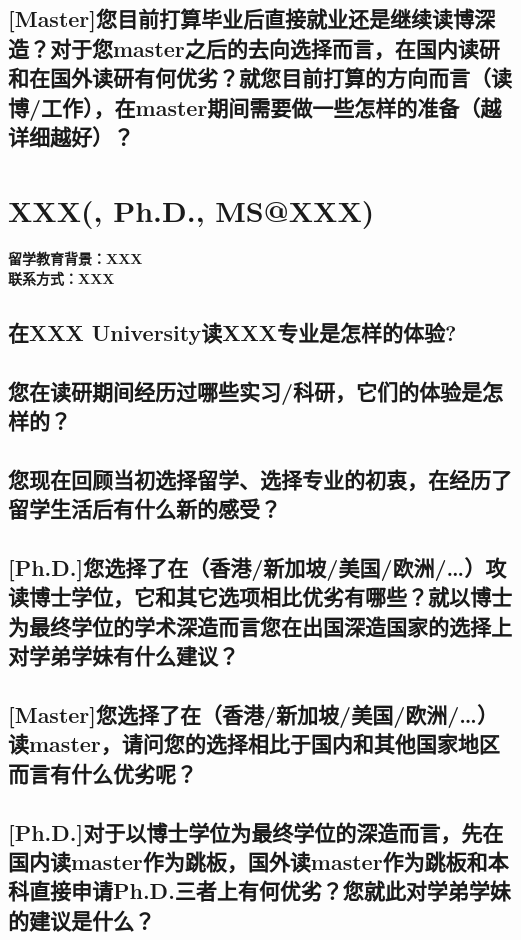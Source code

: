 \documentclass[a4paper,UTF8]{book}
\begin{document}
\subsection*{[Master]您目前打算毕业后直接就业还是继续读博深造？对于您master之后的去向选择而言，在国内读研和在国外读研有何优劣？就您目前打算的方向而言（读博/工作），在master期间需要做一些怎样的准备（越详细越好）？}

\newpage
\section{XXX(, Ph.D., MS@XXX)}
\paragraph{留学教育背景：XXX\\联系方式：XXX}

\subsection*{在XXX University读XXX专业是怎样的体验?}

\subsection*{您在读研期间经历过哪些实习/科研，它们的体验是怎样的？}

\subsection*{您现在回顾当初选择留学、选择专业的初衷，在经历了留学生活后有什么新的感受？}

\subsection*{[Ph.D.]您选择了在（香港/新加坡/美国/欧洲/…）攻读博士学位，它和其它选项相比优劣有哪些？就以博士为最终学位的学术深造而言您在出国深造国家的选择上对学弟学妹有什么建议？}

\subsection*{[Master]您选择了在（香港/新加坡/美国/欧洲/…）读master，请问您的选择相比于国内和其他国家地区而言有什么优劣呢？}

\subsection*{[Ph.D.]对于以博士学位为最终学位的深造而言，先在国内读master作为跳板，国外读master作为跳板和本科直接申请Ph.D.三者上有何优劣？您就此对学弟学妹的建议是什么？}
\end{document}
